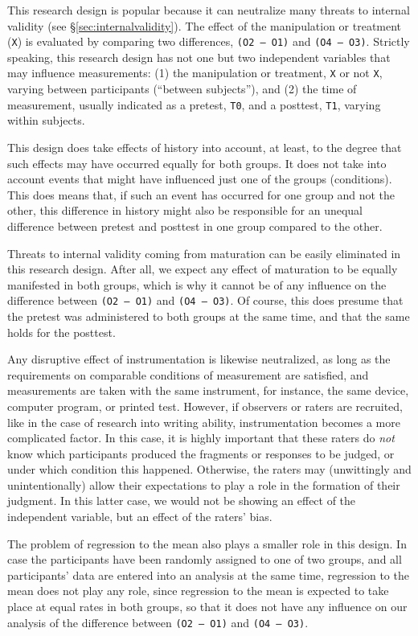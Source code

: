 \documentclass[
]{book}
\begin{document}
This research design is popular because it can neutralize many threats to internal validity (see §\ref{sec:internalvalidity}). The effect of the manipulation or treatment (\texttt{X}) is evaluated by comparing two differences, \texttt{(O2\ –\ O1)} and \texttt{(O4\ –\ O3)}. Strictly speaking, this research design has not one but two independent variables that may influence measurements: (1) the manipulation or treatment, \texttt{X} or not \texttt{X}, varying between participants (``between subjects''), and (2) the time of measurement, usually indicated as a pretest, \texttt{T0}, and a posttest, \texttt{T1}, varying within subjects.

This design does take effects of history into account, at least, to the degree that such effects may have occurred equally for both groups. It does not take into account events that might have influenced just one of the groups (conditions). This does means that, if such an event has occurred for one group and not the other, this difference in history might also be responsible for an unequal difference between pretest and posttest in one group compared to the other.

Threats to internal validity coming from maturation can be easily eliminated in this research design. After all, we expect any effect of maturation to be equally manifested in both groups, which is why it cannot be of any influence on the difference between \texttt{(O2\ –\ O1)} and \texttt{(O4\ –\ O3)}. Of course, this does presume that the pretest was administered to both groups at the same time, and that the same holds for the posttest.

Any disruptive effect of instrumentation is likewise neutralized, as long as the requirements on comparable conditions of measurement are satisfied, and measurements are taken with the same instrument, for instance, the same device, computer program, or printed test. However, if observers or raters are recruited, like in the case of research into writing ability, instrumentation becomes a more complicated factor. In this case, it is highly important that these raters do \emph{not} know which participants produced the fragments or responses to be judged, or under which condition this happened. Otherwise, the raters may (unwittingly and unintentionally) allow their expectations to play a role in the formation of their judgment. In this latter case, we would not be showing an effect of the independent variable, but an effect of the raters' bias.

The problem of regression to the mean also plays a smaller role in this design. In case the participants have been randomly assigned to one of two groups, and all participants' data are entered into an analysis at the same time, regression to the mean does not play any role, since regression to the mean is expected to take place at equal rates in both groups, so that it does not have any influence on our analysis of the difference between \texttt{(O2\ –\ O1)} and \texttt{(O4\ –\ O3)}.
\end{document}
